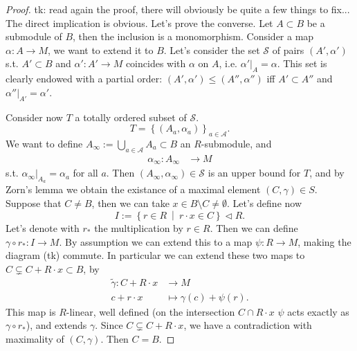 \documentclass[../Main]{subfiles}
\begin{document}
\begin{proof}
	tk: read again the proof, there will obviously be quite a few things to fix...
	The direct implication is obvious.
	Let's prove the converse.
	Let $A \subset B$ be a submodule of $B$, then the inclusion is a monomorphism.
	Consider a map $\alpha\colon A \to M$, we want to extend it to $B$.
	Let's consider the set
	$\mathcal{S}$ of pairs $\left( A', \alpha' \right)$ s.t. $A' \subset B$ and
	$\alpha'\colon A' \to M$ coincides with $\alpha$ on $A$,
	i.e. $\left.\alpha'\right|_{A} = \alpha$.
	This set is clearly endowed with a partial order:
	$(A', \alpha') \leq (A'', \alpha'')$ iff $A' \subset A''$
	and $\left.\alpha''\right|_{A'} = \alpha'$.

	Consider now $T$ a totally ordered subset of $\mathcal{S}$.
	\begin{equation}
		T = \left\{ \left( A_a, \alpha_a \right) \right\}_{a \in \mathcal{A}} 
	.\end{equation} 
	We want to define $A_{\infty} := \bigcup_{a \in \mathcal{A}} A_a \subset B$
	an $R$-submodule, and
	\begin{align}
		\alpha_{\infty}\colon A_{\infty} &\longrightarrow M 
	\end{align} 
	s.t. $\left.\alpha_{\infty}\right|_{A_a} = \alpha_a$ for all $a$.
	Then $(A_\infty, \alpha_\infty) \in \mathcal{S}$ is an upper bound for $T$,
	and by Zorn's lemma we obtain the existance of a maximal element $(C, \gamma) \in S$.
	Suppose that $C \neq B$, then we can take $x \in B \setminus C \neq \emptyset$.
	Let's define now
	\begin{equation}
	I := \left\{ r \in R \ \middle|\ r \cdot x \in C \right\} \triangleleft R
	.\end{equation} 
	Let's denote with $r_*$ the multiplication by $r \in R$.
	Then we can define $\gamma \circ r_*\colon I \to M$.
	By assumption we can extend this to a map $\psi \colon R \to M$, making the diagram (tk) commute.
	In particular we can extend these two maps to $C \subsetneq C + R\cdot x \subset B$, by
	\begin{align}
		\tilde{\gamma}\colon C + R \cdot x &\longrightarrow M \\
		c + r \cdot x &\longmapsto \gamma(c) + \psi(r) \nonumber
	.\end{align} 
	This map is $R$-linear, well defined (on the intersection $C \cap R \cdot x$ $\psi$ acts
	exactly as $\gamma \circ r_*$), and extends $\gamma$.
	Since $C \subsetneq C + R \cdot x$, we have a contradiction with maximality
	of $(C, \gamma)$.
	Then $C = B$.
\end{proof}
\end{document}
